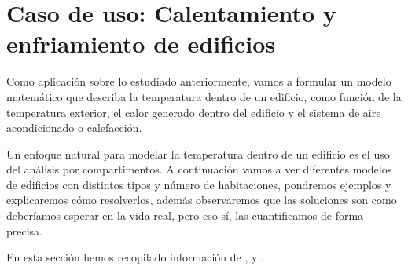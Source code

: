 \chapter{Caso de uso: Calentamiento y enfriamiento de edificios}
Como aplicación sobre lo estudiado anteriormente, vamos a formular un modelo matemático que describa la temperatura dentro de un edificio, como función de la temperatura exterior, el calor generado dentro del edificio y el sistema de aire acondicionado o calefacción.

Un enfoque natural para modelar la temperatura dentro de un edificio es el uso del análisis por compartimentos. A continuación vamos a ver diferentes modelos de edificios con distintos tipos y número de habitaciones, pondremos ejemplos y explicaremos cómo resolverlos, además observaremos que las soluciones son como deberíamos esperar en la vida real, pero eso sí, las cuantificamos de forma precisa.

En esta sección hemos recopilado información de \cite{Campos}, \cite{Nagle} y \cite{tfm}.
